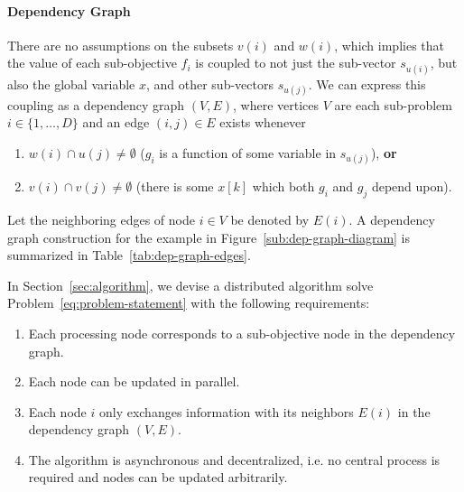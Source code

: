 \paragraph*{Dependency Graph}

There are no assumptions on the subsets $v\left(i\right)$ and $w\left(i\right)$, which implies that the value of each sub-objective $f_i$ is coupled to not just the sub-vector $s_{u\left(i\right)}$, but also the global variable $x$, and other sub-vectors $s_{u\left(j\right)}$. We can express this coupling as a dependency graph $\left(V,E\right)$, where vertices $V$ are each sub-problem $i\in \{1,\ldots, D\} $ and an edge $\left(i,j\right)\in E$ exists whenever

\begin{enumerate}
	\item  $w\left(i\right) \cap u\left(j\right) \neq \emptyset$ ($g_i$ is a function of some variable in $s_{u\left(j\right)}$), \textbf{or}
	\item $v\left(i\right) \cap v\left(j\right) \neq \emptyset$ (there is some $x\left[k\right]$ which both $g_i$ and $g_j$ depend upon).
\end{enumerate}
 
Let the neighboring edges of node $i\in V$ be denoted by $E\left(i\right)$. A dependency graph construction for the example in Figure~\ref{sub:dep-graph-diagram} is summarized in Table~\ref{tab:dep-graph-edges}.

In Section~\ref{sec:algorithm}, we devise a distributed algorithm solve Problem~\eqref{eq:problem-statement} with the following requirements:

\begin{enumerate}
	\item Each processing node corresponds to a sub-objective node in the dependency graph.
	\item Each node can be updated in parallel.
	\item Each node $i$ only exchanges information with its neighbors $E\left(i\right)$ in the dependency graph $\left(V,E\right)$.
	\item The algorithm is asynchronous and decentralized, i.e. no central process is required and nodes can be updated arbitrarily.
\end{enumerate}


